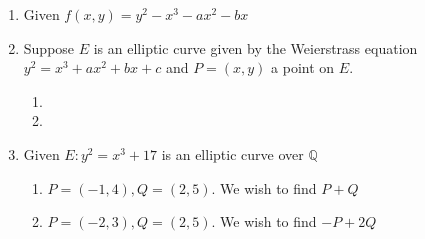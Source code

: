 \documentclass[oneside, 12pt, ]{article}
\newcommand{\QQ}{\mathbb Q}
\begin{document}
\begin{enumerate}
\item Given $f(x,y) = y^2 - x^3 - ax^2 - bx$

\item Suppose $E$ is an elliptic curve given by the Weierstrass equation $y^2 = x^3 + ax^2 + bx + c$ and $P = (x,y)$ a point on $E$.
\begin{enumerate}
\item

\item 
\end{enumerate}

\item Given $E: y^2 =x^3 + 17$ is an elliptic curve over $\QQ$

\begin{enumerate}
\item $P = (-1,4), Q = (2,5)$. We wish to find $P + Q$

\item $P =(-2,3), Q = (2,5)$. We wish to find $-P + 2Q$ 
\end{enumerate} 
\end{enumerate}
\end{document}
